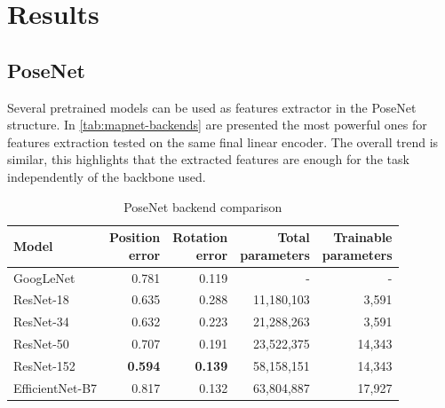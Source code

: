 \section{Results}
\subsection{PoseNet}
Several pretrained models can be used as features extractor in the PoseNet structure. In \cref{tab:mapnet-backends} are presented the most powerful ones for features extraction tested on the same final linear encoder. The overall trend is similar, this highlights that the extracted features are enough for the task independently of the backbone used.
\begin{table}[htbp]
    \caption{PoseNet backend comparison}
    \begin{center}
        \begin{tabular}{lrrrr}
            \toprule
            {Model}         & \thead{Position                                        \\error} & \thead{Rotation\\error} & \thead{Total\\parameters} & \thead{Trainable\\parameters} \\
            \midrule
            GoogLeNet       & 0.781           & 0.119          & -          & -      \\
            ResNet-18       & 0.635           & 0.288          & 11,180,103 & 3,591  \\
            ResNet-34       & 0.632           & 0.223          & 21,288,263 & 3,591  \\
            ResNet-50       & 0.707           & 0.191          & 23,522,375 & 14,343 \\
            ResNet-152      & \textbf{0.594}  & \textbf{0.139} & 58,158,151 & 14,343 \\
            EfficientNet-B7 & 0.817           & 0.132          & 63,804,887 & 17,927 \\
            \bottomrule
        \end{tabular}
        \label{tab:posenet-backends}
    \end{center}
\end{table}

